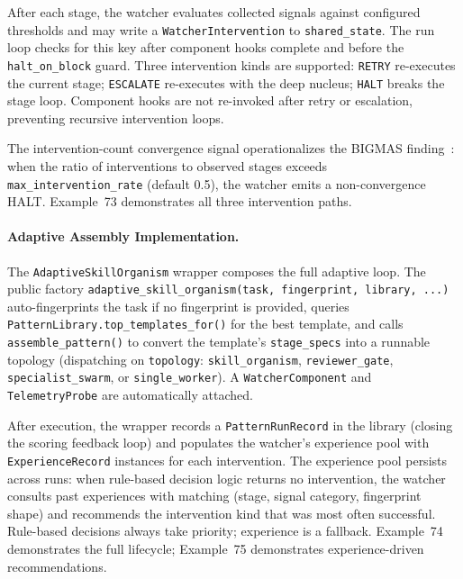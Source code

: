 After each stage, the watcher evaluates collected signals against configured thresholds and may write a \texttt{WatcherIntervention} to \texttt{shared\_state}. The run loop checks for this key after component hooks complete and before the \texttt{halt\_on\_block} guard. Three intervention kinds are supported: \texttt{RETRY} re-executes the current stage; \texttt{ESCALATE} re-executes with the deep nucleus; \texttt{HALT} breaks the stage loop. Component hooks are not re-invoked after retry or escalation, preventing recursive intervention loops.

The intervention-count convergence signal operationalizes the BIGMAS finding~\cite{hao2026bigmas}: when the ratio of interventions to observed stages exceeds \texttt{max\_intervention\_rate} (default 0.5), the watcher emits a non-convergence HALT. Example~73 demonstrates all three intervention paths.

\paragraph{Adaptive Assembly Implementation.}
\label{sec:adaptive-impl}
The \texttt{AdaptiveSkillOrganism} wrapper composes the full adaptive loop. The public factory \texttt{adaptive\_skill\_organism}\allowbreak\texttt{(task, fingerprint, library, ...)} auto-fingerprints the task if no fingerprint is provided, queries \texttt{PatternLibrary.}\allowbreak\texttt{top\_templates\_for()} for the best template, and calls \texttt{assemble\_pattern()} to convert the template's \texttt{stage\_specs} into a runnable topology (dispatching on \texttt{topology}: \texttt{skill\_organism}, \texttt{reviewer\_gate}, \texttt{specialist\_swarm}, or \texttt{single\_worker}). A \texttt{WatcherComponent} and \texttt{TelemetryProbe} are automatically attached.

After execution, the wrapper records a \texttt{PatternRunRecord} in the library (closing the scoring feedback loop) and populates the watcher's experience pool with \texttt{ExperienceRecord} instances for each intervention. The experience pool persists across runs: when rule-based decision logic returns no intervention, the watcher consults past experiences with matching (stage, signal category, fingerprint shape) and recommends the intervention kind that was most often successful. Rule-based decisions always take priority; experience is a fallback. Example~74 demonstrates the full lifecycle; Example~75 demonstrates experience-driven recommendations.

